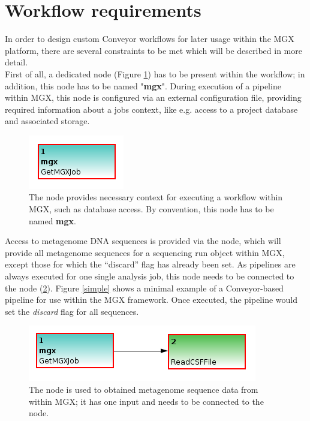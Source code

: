 \section{Workflow requirements}

In order to design custom Conveyor workflows for later usage within the MGX platform, there
are several constraints to be met which will be described in more detail.\\

First of all, a dedicated  node (Figure \ref{getmgxjob}) has to be present within the workflow; in addition,
this node has to be named "\textbf{mgx}". During execution of a pipeline within MGX, this node is
configured via an external configuration file, providing required information about a jobs
context, like e.g. access to a project database and associated storage.\\

\begin{figure}[H]
\centering
\includegraphics[width=.3\textwidth]{img/conveyor/getjob}
\caption[]{The  node provides necessary context for executing a
workflow within MGX, such as database access. By convention, this node has to be named \textbf{mgx}.}
\label{getmgxjob}
\end{figure}

Access to metagenome DNA sequences is provided via the  node, which will provide
all metagenome sequences for a sequencing run object within MGX, except those for which the 
``discard'' flag has already been set. As pipelines are always executed
for one single analysis job, this node needs to be connected to the  node (\ref{readcsf}).
Figure \ref{simple} shows a minimal example of a Conveyor-based pipeline for use within the MGX framework.
Once executed, the pipeline would set the \textit{discard} flag for all sequences.

\begin{figure}[H]
\centering
\includegraphics[width=.6\textwidth]{img/conveyor/getjobreadcsf}
\caption[]{The  node is used to obtained metagenome sequence data 
from within MGX; it has one input and needs to be connected to the  node.}
\label{readcsf}
\end{figure}

